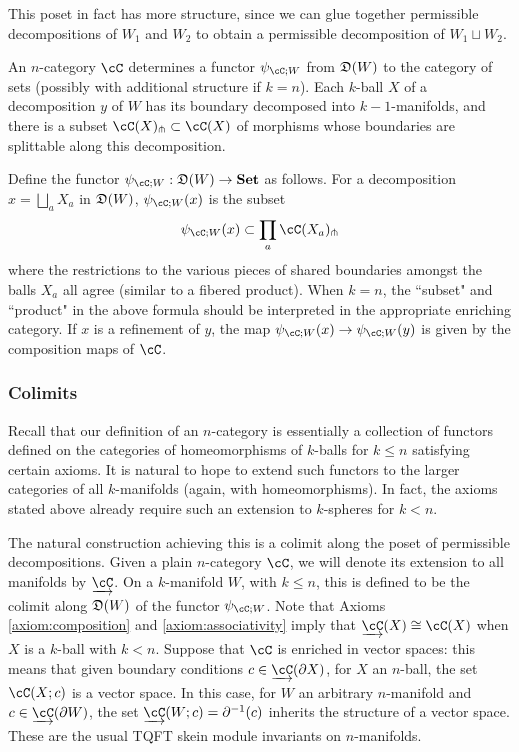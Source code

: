 \documentclass{pnastwo}
\begin{document}
\begin{article}
This poset in fact has more structure, since we can glue together permissible decompositions of 
$W_1$ and $W_2$ to obtain a permissible decomposition of $W_1 \sqcup W_2$. 

An $n$-category $\cC$ determines 
a functor $\psi_{\cC;W}$ from $\mathfrak{D}(W)$ to the category of sets 
(possibly with additional structure if $k=n$).
Each $k$-ball $X$ of a decomposition $y$ of $W$ has its boundary decomposed into $k{-}1$-manifolds,
and there is a subset $\cC(X)\spl \subset \cC(X)$ of morphisms whose boundaries
are splittable along this decomposition.

\begin{defn}
Define the functor $\psi_{\cC;W} : \cell(W) \to \Set$ as follows.
For a decomposition $x = \bigsqcup_a X_a$ in $\mathfrak{D}(W)$, $\psi_{\cC;W}(x)$ is the subset
\begin{equation*}
	\psi_{\cC;W}(x) \subset \prod_a \cC(X_a)\spl
\end{equation*}
where the restrictions to the various pieces of shared boundaries amongst the balls
$X_a$ all agree (similar to a fibered product). 
When $k=n$, the ``subset" and ``product" in the above formula should be 
interpreted in the appropriate enriching category.
If $x$ is a refinement of $y$, the map $\psi_{\cC;W}(x) \to \psi_{\cC;W}(y)$ is given by the composition maps of $\cC$.
\end{defn}



\subsubsection{Colimits}
Recall that our definition of an $n$-category is essentially a collection of functors
defined on the categories of homeomorphisms of $k$-balls
for $k \leq n$ satisfying certain axioms. 
It is natural to hope to extend such functors to the 
larger categories of all $k$-manifolds (again, with homeomorphisms). 
In fact, the axioms stated above already require such an extension to $k$-spheres for $k<n$.

The natural construction achieving this is a colimit along the poset of permissible decompositions.
Given a plain $n$-category $\cC$, 
we will denote its extension to all manifolds by $\cl{\cC}$. On a $k$-manifold $W$, with $k \leq n$, 
this is defined to be the colimit along $\mathfrak{D}(W)$ of the functor $\psi_{\cC;W}$. 
Note that Axioms \ref{axiom:composition} and \ref{axiom:associativity} 
imply that $\cl{\cC}(X)  \iso \cC(X)$ when $X$ is a $k$-ball with $k<n$. 
Suppose that $\cC$ is enriched in vector spaces: this means that given boundary conditions $c \in \cl{\cC}(\bdy X)$, for $X$ an $n$-ball, 
the set $\cC(X;c)$ is a vector space. 
In this case, for $W$ an arbitrary $n$-manifold and $c \in \cl{\cC}(\bdy W)$,
the set $\cl{\cC}(W;c) = \bdy^{-1} (c)$ inherits the structure of a vector space. 
These are the usual TQFT skein module invariants on $n$-manifolds.


\end{article}
\end{document}
